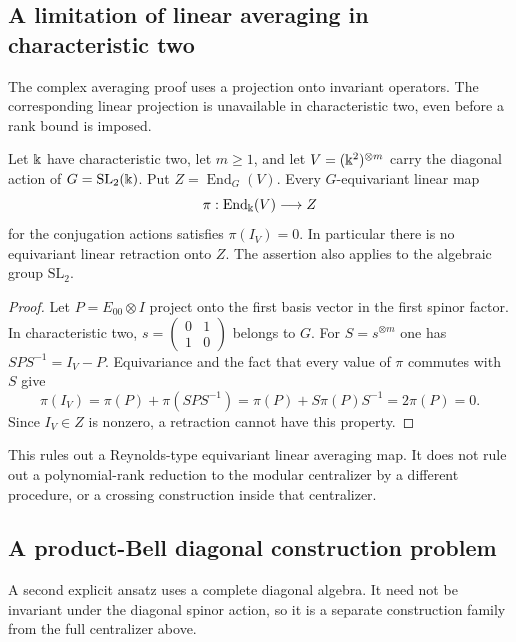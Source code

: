 \subsection{A limitation of linear averaging in characteristic two}

The complex averaging proof uses a projection onto invariant
operators. The corresponding linear projection is unavailable in
characteristic two, even before a rank bound is imposed.

\begin{proposition}
\label{prop:char2-reynolds-obstruction}
Let $\Bbbk$ have characteristic two, let $m\geq1$, and let
$V=(\Bbbk^2)^{\otimes m}$ carry the diagonal action of
$G=\mathrm{SL}_2(\Bbbk)$. Put $Z=\operatorname{End}_G(V)$.
Every $G$-equivariant linear map
\[
 \pi:\operatorname{End}_{\Bbbk}(V)\longrightarrow Z
\]
for the conjugation actions satisfies $\pi(I_V)=0$.
In particular there is no equivariant linear retraction onto $Z$.
The assertion also applies to the algebraic group $\mathrm{SL}_2$.
\end{proposition}
\begin{proof}
Let $P=E_{00}\otimes I$ project onto the first basis vector in
the first spinor factor. In characteristic two,
$s=\left(\begin{smallmatrix}0&1\\1&0\end{smallmatrix}\right)$
belongs to $G$. For $S=s^{\otimes m}$ one has
$SPS^{-1}=I_V-P$. Equivariance and the fact that every value of
$\pi$ commutes with $S$ give
\[
 \pi(I_V)=\pi(P)+\pi(SPS^{-1})
          =\pi(P)+S\pi(P)S^{-1}=2\pi(P)=0.
\]
Since $I_V\in Z$ is nonzero, a retraction cannot have this property.
\end{proof}

This rules out a Reynolds-type equivariant linear averaging map.
It does not rule out a polynomial-rank reduction to the modular
centralizer by a different procedure, or a crossing construction
inside that centralizer.

\subsection{A product-Bell diagonal construction problem}

A second explicit ansatz uses a complete diagonal algebra. It need
not be invariant under the diagonal spinor action, so it is a
separate construction family from the full centralizer above.

